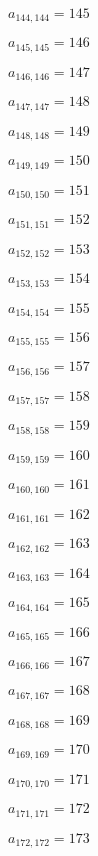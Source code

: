 \documentclass[a4paper,12pt]{article}
\begin{document}
$a _{ 144, 144 } = 145$

$a _{ 145, 145 } = 146$

$a _{ 146, 146 } = 147$

$a _{ 147, 147 } = 148$

$a _{ 148, 148 } = 149$

$a _{ 149, 149 } = 150$

$a _{ 150, 150 } = 151$

$a _{ 151, 151 } = 152$

$a _{ 152, 152 } = 153$

$a _{ 153, 153 } = 154$

$a _{ 154, 154 } = 155$

$a _{ 155, 155 } = 156$

$a _{ 156, 156 } = 157$

$a _{ 157, 157 } = 158$

$a _{ 158, 158 } = 159$

$a _{ 159, 159 } = 160$

$a _{ 160, 160 } = 161$

$a _{ 161, 161 } = 162$

$a _{ 162, 162 } = 163$

$a _{ 163, 163 } = 164$

$a _{ 164, 164 } = 165$

$a _{ 165, 165 } = 166$

$a _{ 166, 166 } = 167$

$a _{ 167, 167 } = 168$

$a _{ 168, 168 } = 169$

$a _{ 169, 169 } = 170$

$a _{ 170, 170 } = 171$

$a _{ 171, 171 } = 172$

$a _{ 172, 172 } = 173$
\end{document}
